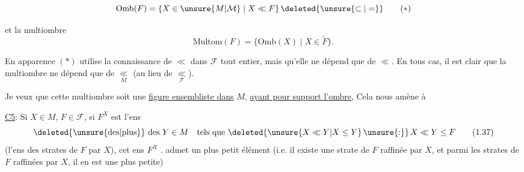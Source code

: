 
\[
 \mathrm{Omb}(F)=\{X\in\unsure{M|\mathcal{M}}\mid X\ll F\}\,\deleted{\unsure{\subset|=}}
 \tag*{$(*)$}
\]

et la multiombre
\[
 \mathrm{Multom}(F)=\{\mathrm{Omb}(X)\mid X\in\widetilde F\}.
 \tag*{$(**)$}
\]

En apparence $(*)$ utilise la connaissance de $\ll$ dans $\mathcal{F}$ tout entier, mais    qu'elle ne dépend que de $\ll$. En tous cas, il est clair que la multiombre ne dépend que de $\underset{M}{\ll}$ (au lieu de $\underset{\mathcal{F}}{\ll}$).


Je veux que cette multiombre soit une \uline{figure ensembliste dans} $M$, \uline{ayant pour support l'ombre},  Cela nous amène à


\uline{C5}: Si $X\in M$, $F\in\mathcal{F}$,  si $F^X$ est l'ens
\[
 \text{\deleted{\unsure{des|plus}} des }Y\in M\quad\text{tels que }\deleted{\unsure{X\ll Y|X\leq Y}\,\unsure{:}}\,X\ll Y\leq F
 \tag*{(1.37)}
\]
(l'ens des strates de $F$  par $X$),  cet ens $F^X$ . admet un plus petit élément  (i.e. il existe une strate de $F$ raffinée par $X$, et parmi  les strates de $F$ raffinées par $X$, il en est une plus petite)



